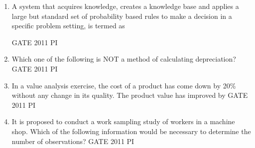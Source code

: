\documentclass[journal,12pt,onecolumn]{IEEEtran}
\theoremstyle{remark}
\begin{document}
\begin{enumerate}
\item
A system that acquires knowledge, creates a knowledge base and applies a large but standard set of probability based rules to make a decision in a specific problem setting, is termed as

\hfill{GATE 2011 PI}
\begin{enumerate}
\end{enumerate}
\item
Which one of the following is NOT a method of calculating depreciation?
\hfill{GATE 2011 PI}
\begin{enumerate}
\end{enumerate}

\item
In a value analysis exercise, the cost of a product has come down by 20\% without any change in its quality. The product value has improved by
\hfill{GATE 2011 PI}
\begin{enumerate}
\end{enumerate}

\item
It is proposed to conduct a work sampling study of workers in a machine shop. Which of the following information would be necessary to determine the number of observations?
\hfill{GATE 2011 PI}
\begin{enumerate}
\end{enumerate}

\end{enumerate}
\end{document}
